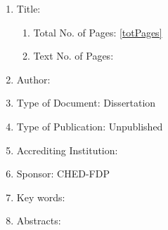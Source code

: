 
\begin{enumerate}[leftmargin=0em, itemindent=1.8em]
\item Title: 
	\begin{minipage}[t]{0.75\textwidth}
		\vspace{-1.9em}
		\singlespacing{\DissertationFullTitle}
		\vspace{0.7em}
	\end{minipage}

\begin{enumerate}[leftmargin=1.5em,label*=\arabic*.]	
	
	\item Total No. of Pages: 
		\else
			\ref{totPages}
		\fi	
	\item Text No. of Pages: 
		\else
			\pageref{TotPages}
		\fi
\end{enumerate}


\item Author: \MakeUppercase{\FullNameFamilyFirst}
\item Type of Document: Dissertation
\item Type of Publication: Unpublished

\item Accrediting Institution: 
	\begin{minipage}[t]{0.5\textwidth}
		\vspace{-1.9em}
		\vspace{0.5em}
	\end{minipage}

\item Sponsor: CHED-FDP
\item Key words: 
	\begin{minipage}[t]{0.7\textwidth}
		\vspace{-1.9em}
			\singlespacing{\Keywords}
		\vspace{0.5em}
	\end{minipage}

\item Abstracts:


\end{enumerate}
